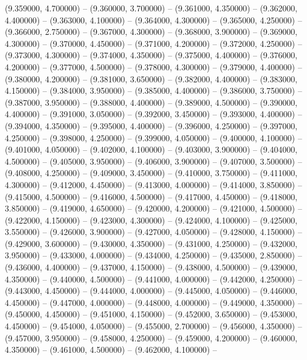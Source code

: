 (9.359000, 4.700000) -- 
(9.360000, 3.700000) -- 
(9.361000, 4.350000) -- 
(9.362000, 4.400000) -- 
(9.363000, 4.100000) -- 
(9.364000, 4.300000) -- 
(9.365000, 4.250000) -- 
(9.366000, 2.750000) -- 
(9.367000, 4.300000) -- 
(9.368000, 3.900000) -- 
(9.369000, 4.300000) -- 
(9.370000, 4.450000) -- 
(9.371000, 4.200000) -- 
(9.372000, 4.250000) -- 
(9.373000, 4.300000) -- 
(9.374000, 4.350000) -- 
(9.375000, 4.400000) -- 
(9.376000, 4.200000) -- 
(9.377000, 4.500000) -- 
(9.378000, 4.300000) -- 
(9.379000, 4.400000) -- 
(9.380000, 4.200000) -- 
(9.381000, 3.650000) -- 
(9.382000, 4.400000) -- 
(9.383000, 4.150000) -- 
(9.384000, 3.950000) -- 
(9.385000, 4.400000) -- 
(9.386000, 3.750000) -- 
(9.387000, 3.950000) -- 
(9.388000, 4.400000) -- 
(9.389000, 4.500000) -- 
(9.390000, 4.400000) -- 
(9.391000, 3.050000) -- 
(9.392000, 3.450000) -- 
(9.393000, 4.400000) -- 
(9.394000, 4.350000) -- 
(9.395000, 4.400000) -- 
(9.396000, 4.250000) -- 
(9.397000, 4.250000) -- 
(9.398000, 4.250000) -- 
(9.399000, 4.050000) -- 
(9.400000, 4.100000) -- 
(9.401000, 4.050000) -- 
(9.402000, 4.100000) -- 
(9.403000, 3.900000) -- 
(9.404000, 4.500000) -- 
(9.405000, 3.950000) -- 
(9.406000, 3.900000) -- 
(9.407000, 3.500000) -- 
(9.408000, 4.250000) -- 
(9.409000, 3.450000) -- 
(9.410000, 3.750000) -- 
(9.411000, 4.300000) -- 
(9.412000, 4.450000) -- 
(9.413000, 4.000000) -- 
(9.414000, 3.850000) -- 
(9.415000, 4.500000) -- 
(9.416000, 4.500000) -- 
(9.417000, 4.450000) -- 
(9.418000, 3.850000) -- 
(9.419000, 4.650000) -- 
(9.420000, 4.200000) -- 
(9.421000, 4.500000) -- 
(9.422000, 4.150000) -- 
(9.423000, 4.300000) -- 
(9.424000, 4.100000) -- 
(9.425000, 3.550000) -- 
(9.426000, 3.900000) -- 
(9.427000, 4.050000) -- 
(9.428000, 4.150000) -- 
(9.429000, 3.600000) -- 
(9.430000, 4.350000) -- 
(9.431000, 4.250000) -- 
(9.432000, 3.950000) -- 
(9.433000, 4.000000) -- 
(9.434000, 4.250000) -- 
(9.435000, 2.850000) -- 
(9.436000, 4.400000) -- 
(9.437000, 4.150000) -- 
(9.438000, 4.500000) -- 
(9.439000, 4.350000) -- 
(9.440000, 4.500000) -- 
(9.441000, 4.000000) -- 
(9.442000, 4.250000) -- 
(9.443000, 4.450000) -- 
(9.444000, 4.000000) -- 
(9.445000, 4.050000) -- 
(9.446000, 4.450000) -- 
(9.447000, 4.000000) -- 
(9.448000, 4.000000) -- 
(9.449000, 4.350000) -- 
(9.450000, 4.450000) -- 
(9.451000, 4.150000) -- 
(9.452000, 3.650000) -- 
(9.453000, 4.450000) -- 
(9.454000, 4.050000) -- 
(9.455000, 2.700000) -- 
(9.456000, 4.350000) -- 
(9.457000, 3.950000) -- 
(9.458000, 4.250000) -- 
(9.459000, 4.200000) -- 
(9.460000, 4.350000) -- 
(9.461000, 4.500000) -- 
(9.462000, 4.100000) -- 
